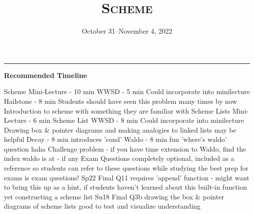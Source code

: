 \documentclass{exam}
\title{\textsc{Scheme}}
\date{October 31--November 4, 2022}
\begin{document}
\maketitle
\rule{\textwidth}{0.15em}
\fontsize{12}{15}\selectfont

\begin{guide}
\begin{blocksection}
\textbf{Recommended Timeline}
\begin{outline}[enumerate]
  \1 Scheme Mini-Lecture - 10 min
  \1 WWSD - 5 min
  \2 Could incorporate into minilecture
  \1 Hailstone - 8 min
  \2 Students should have seen this problem many times by now
  \2 Introduction to scheme with something they are familiar with
  \1 Scheme Lists Mini-Lecture - 6 min
  \1 Scheme List WWSD - 8 min
  \2 Could incorporate into minilecture
  \2 Drawing box \& pointer diagrams and making analogies to linked lists may be helpful
  \1 Decay - 8 min
  \2 introduces 'cond'
  \1 Waldo - 8 min
  \2 fun 'where's waldo' question haha
  \1 Challenge problem - if you have time
  \2 extension to Waldo, find the index waldo is at - if any
  \1 Exam Questions
  \2 completely optional, included as a reference so students can refer to these questions while studying
  \2 the best prep for exams is exam questions!
  \2 Sp22 Final Q11
  \3 requires 'append' function - might want to bring this up as a hint, if students haven't learned about this built-in function yet
  \3 constructing a scheme list
  \2 Su18 Final Q3b
  \3 drawing the box \& pointer diagrams of scheme lists
  \3 good to test and visualize understanding
\end{outline}
\end{blocksection}
\end{guide}
\end{document}
